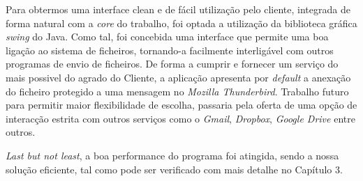Para obtermos uma interface clean e de fácil utilização pelo cliente, integrada de forma natural com a \textit{core} do trabalho, foi optada a utilização da biblioteca gráfica \textit{swing} do Java.
Como tal, foi concebida uma interface que permite uma boa ligação ao sistema de ficheiros, tornando-a facilmente interligável com outros programas de envio de ficheiros.
De forma a cumprir e fornecer um serviço do mais possivel do agrado do Cliente, a aplicação apresenta por \textit{default} a anexação do ficheiro protegido a uma mensagem no \textit{Mozilla Thunderbird}. Trabalho futuro para permitir maior flexibilidade de escolha, passaria pela oferta de uma opção de interacção estrita com outros serviços como o \textit{Gmail}, \textit{Dropbox}, \textit{Google Drive} entre outros.

\textit{Last but not least}, a boa performance do programa foi atingida, sendo a nossa solução eficiente, tal como pode ser verificado com mais detalhe no Capítulo 3.


\clearpage
\newpage

